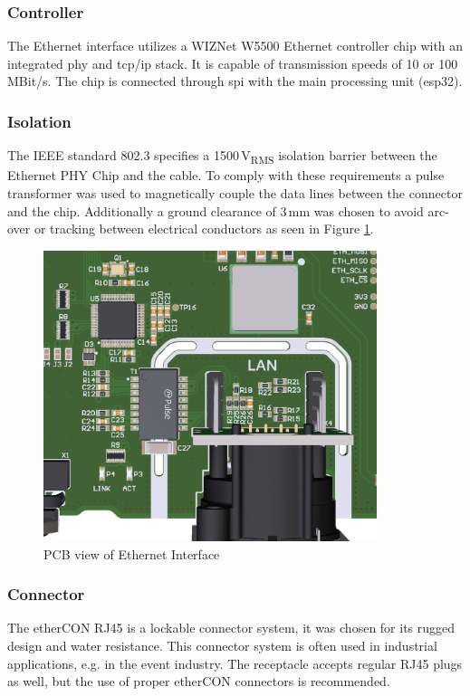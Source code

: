 \subsubsection{Controller}
The Ethernet interface utilizes a WIZNet W5500 Ethernet controller chip with an integrated \acrshort{phy} and \acrshort{tcp/ip} stack. It is capable of transmission speeds of 10 or 100\,MBit/s. The chip is connected through \acrshort{spi} with the main processing unit (\gls{esp32}).

\subsubsection{Isolation}
The IEEE standard 802.3 specifies a 1500\,V\textsubscript{RMS} isolation barrier between the Ethernet PHY Chip and the cable. To comply with these requirements a pulse transformer was used to magnetically couple the data lines between the connector and the chip. Additionally a ground clearance of 3\,mm was chosen to avoid arc-over or tracking between electrical conductors as seen in Figure \ref{fig:eth-pcb}. 

\begin{figure}[h!]
	\centering
	\includegraphics[height=8.5cm]{images/eth-pcb}
	\vspace{0.2cm}
	\caption{PCB view of Ethernet Interface}
	\label{fig:eth-pcb}
\end{figure}
\newpage

\subsubsection{Connector}
The etherCON RJ45 is a lockable connector system, it was chosen for its rugged design and water resistance. This connector system is often used in industrial applications, e.g. in the event industry. The receptacle accepts regular RJ45 plugs as well, but the use of proper etherCON connectors is recommended.


